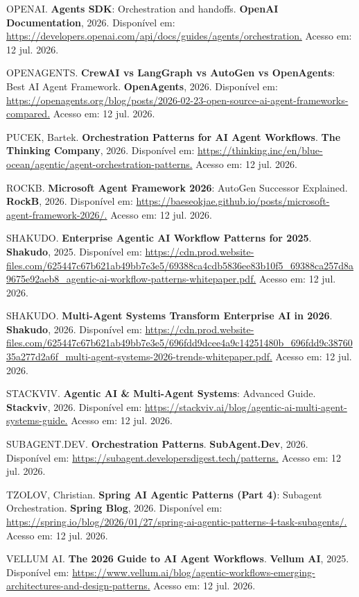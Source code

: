 \documentclass[12pt,a4paper]{article}
\begin{document}
OPENAI. \textbf{Agents SDK}: Orchestration and handoffs. \textbf{OpenAI Documentation}, 2026. Disponível em: \url{https://developers.openai.com/api/docs/guides/agents/orchestration.} Acesso em: 12 jul. 2026.

OPENAGENTS. \textbf{CrewAI vs LangGraph vs AutoGen vs OpenAgents}: Best AI Agent Framework. \textbf{OpenAgents}, 2026. Disponível em: \url{https://openagents.org/blog/posts/2026-02-23-open-source-ai-agent-frameworks-compared.} Acesso em: 12 jul. 2026.

PUCEK, Bartek. \textbf{Orchestration Patterns for AI Agent Workflows}. \textbf{The Thinking Company}, 2026. Disponível em: \url{https://thinking.inc/en/blue-ocean/agentic/agent-orchestration-patterns.} Acesso em: 12 jul. 2026.

ROCKB. \textbf{Microsoft Agent Framework 2026}: AutoGen Successor Explained. \textbf{RockB}, 2026. Disponível em: \url{https://baeseokjae.github.io/posts/microsoft-agent-framework-2026/.} Acesso em: 12 jul. 2026.

SHAKUDO. \textbf{Enterprise Agentic AI Workflow Patterns for 2025}. \textbf{Shakudo}, 2025. Disponível em: \url{https://cdn.prod.website-files.com/625447c67b621ab49bb7e3e5/69388ca4cdb5836ee83b10f5\_69388ca257d8a9675e92aeb8\_agentic-ai-workflow-patterns-whitepaper.pdf.} Acesso em: 12 jul. 2026.

SHAKUDO. \textbf{Multi-Agent Systems Transform Enterprise AI in 2026}. \textbf{Shakudo}, 2026. Disponível em: \url{https://cdn.prod.website-files.com/625447c67b621ab49bb7e3e5/696fdd9dcee4a9c14251480b\_696fdd9c3876035a277d2a6f\_multi-agent-systems-2026-trends-whitepaper.pdf.} Acesso em: 12 jul. 2026.

STACKVIV. \textbf{Agentic AI \& Multi-Agent Systems}: Advanced Guide. \textbf{Stackviv}, 2026. Disponível em: \url{https://stackviv.ai/blog/agentic-ai-multi-agent-systems-guide.} Acesso em: 12 jul. 2026.

SUBAGENT.DEV. \textbf{Orchestration Patterns}. \textbf{SubAgent.Dev}, 2026. Disponível em: \url{https://subagent.developersdigest.tech/patterns.} Acesso em: 12 jul. 2026.

TZOLOV, Christian. \textbf{Spring AI Agentic Patterns (Part 4)}: Subagent Orchestration. \textbf{Spring Blog}, 2026. Disponível em: \url{https://spring.io/blog/2026/01/27/spring-ai-agentic-patterns-4-task-subagents/.} Acesso em: 12 jul. 2026.

VELLUM AI. \textbf{The 2026 Guide to AI Agent Workflows}. \textbf{Vellum AI}, 2025. Disponível em: \url{https://www.vellum.ai/blog/agentic-workflows-emerging-architectures-and-design-patterns.} Acesso em: 12 jul. 2026.
\end{document}
